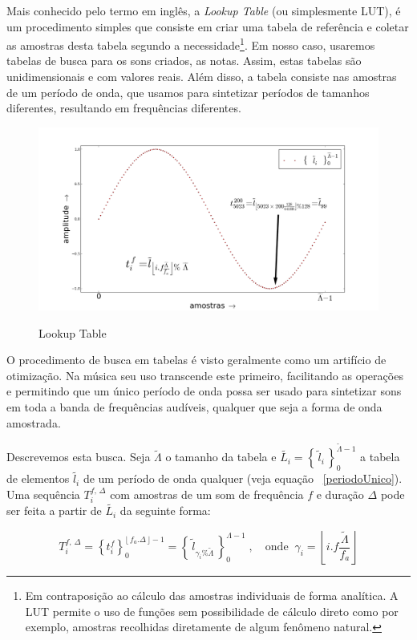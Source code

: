 Mais conhecido pelo termo em inglês, a \emph{Lookup Table} (ou simplesmente
LUT), é um procedimento simples que consiste em criar uma tabela
de referência e coletar as amostras desta tabela segundo a 
necessidade\footnote{Em contraposição ao cálculo das amostras individuais
de forma analítica. A LUT permite o uso de funções sem possibilidade de cálculo direto como
por exemplo, amostras recolhidas diretamente de algum fenômeno natural.}. Em nosso caso, usaremos tabelas de busca para os
sons criados, as notas. Assim, estas tabelas são unidimensionais e com
valores reais. Além disso, a tabela consiste nas amostras
de um período de onda, que usamos para sintetizar períodos
de tamanhos diferentes, resultando em frequências diferentes.

\begin{figure}[h!]
    \centering
    \caption{Lookup Table}
        \includegraphics[width=\textwidth]{figuras/lut}
        \label{fig:lut}
\end{figure}

O procedimento de busca em tabelas é visto geralmente como um
artifício de otimização. Na música seu uso transcende este
primeiro, facilitando as operações e permitindo que um único
período de onda possa ser usado para sintetizar sons em toda a banda
de frequências audíveis, qualquer que seja a forma de onda amostrada.

Descrevemos esta busca. Seja $\widetilde{\Lambda}$ o tamanho 
da tabela e $\widetilde{L_i} = \left\{\, \widetilde{l}_i \,\right\}_0^{\widetilde{\Lambda} -1}$ a tabela de elementos $\widetilde{l_i}$ de um
período de onda qualquer (veja equação ~\ref{periodoUnico}). Uma sequência
$T_i^{f,\,\Delta}$ com amostras de um som de frequência $f$ e duração $\Delta$
pode ser feita a partir de $\widetilde{L_i}$ da seguinte forma:

\begin{equation}
T_i^{f,\,\Delta}=\left\{t_i^f\right\}_0^{\lfloor \, f_a . \Delta \, \rfloor -1} = \left\{ \, \widetilde{l}_{\gamma_i \% \widetilde{\Lambda} }\, \right\}_{0}^{\Lambda-1}\; , \quad \text{onde} \;\; \gamma_i = \left \lfloor i . f \frac{ \widetilde{\Lambda}}{f_a} \right \rfloor  
\end{equation}

